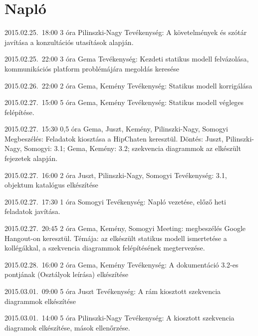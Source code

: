 %
\section{Napló}

\begin{naplo}

\bejegyzes
{2015.02.25.~18:00} %
{3 óra} %
{Pilinszki-Nagy} %
{Tevékenység: A követelmények és szótár javítása a konzultációs utasítások alapján.} %

\bejegyzes
{2015.02.25.~22:00}
{3 óra}
{Gema}
{Tevékenység: Kezdeti statikus modell felvázolása, kommunikációs platform problémájára megoldás keresése}

\bejegyzes
{2015.02.26.~22:00}
{2 óra}
{Gema, Kemény}
{Tevékenység: Statikus modell korrigálása}

\bejegyzes
{2015.02.27.~15:00} %
{5 óra} %
{Gema, Kemény} %
{Tevékenység: Statikus modell végleges felépítése.} %

\bejegyzes
{2015.02.27.~15:30} %
{0,5 óra} %
{Gema, Juszt, Kemény, Pilinszki-Nagy, Somogyi} %
{Megbeszélés: Feladatok kiosztása a HipChaten keresztül. Döntés: Juszt, Pilinszki-Nagy, Somogyi: 3.1; Gema, Kemény: 3.2; szekvencia diagrammok az elkészült fejezetek alapján.} %

\bejegyzes
{2015.02.27.~16:00} %
{2 óra} %
{Juszt, Pilinszki-Nagy, Somogyi} %
{Tevékenység: 3.1, objektum katalógus elkészítése} %

\bejegyzes
{2015.02.27.~17:30} %
{1 óra} %
{Somogyi} %
{Tevékenység: Napló vezetése, előző heti feladatok javítása.} %

\bejegyzes
{2015.02.27.~20:45} %
{2 óra} %
{Gema, Kemény, Somogyi} %
{Meeting: megbeszélés Google Hangout-on keresztül. Témája: az elkészült statikus modell ismertetése a kollégákkal, a szekvencia diagrammok felépítésének megtervezése.} %

\bejegyzes
{2015.02.28.~16:00}
{2 óra}
{Gema, Kemény}
{Tevékenység: A dokumentáció 3.2-es pontjának (Osztályok leírása) elkészítése}

\bejegyzes
{2015.03.01.~09:00}
{5 óra}
{Juszt}
{Tevékenység: A rám kiosztott szekvencia diagrammok elkészítése}

\bejegyzes
{2015.03.01.~14:00}
{5 óra}
{Pilinszki-Nagy}
{Tevékenység: A kiosztott szekvencia diagramok elkészítése, mások ellenőrzése.}

\end{naplo}

